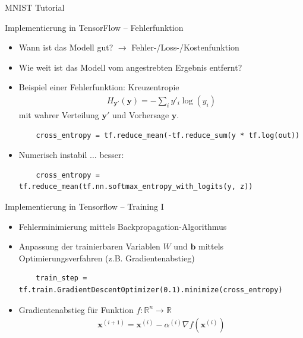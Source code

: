 \documentclass[utf8, smaller, c]{beamer}
\begin{document}
\begin{frame}{MNIST Tutorial}
	\begin{block}{Implementierung in TensorFlow -- Fehlerfunktion}
		\begin{itemize}
			\item Wann ist das Modell gut? $\rightarrow$ Fehler-/Loss-/Kostenfunktion
			\item Wie weit ist das Modell vom angestrebten Ergebnis entfernt?
			\item Beispiel einer Fehlerfunktion: Kreuzentropie
			\begin{align*}
				H_{\mathbf{y}'}(\mathbf{y}) = -\sum_i y'_i\log(y_i)
			\end{align*}
			mit wahrer Verteilung $\mathbf{y}'$ und Vorhersage $\mathbf{y}$.
			\begin{lstlisting}
	cross_entropy = tf.reduce_mean(-tf.reduce_sum(y * tf.log(out))
			\end{lstlisting}
			\item Numerisch instabil $\dots$ besser:
			\begin{lstlisting}
	cross_entropy = tf.reduce_mean(tf.nn.softmax_entropy_with_logits(y, z))
			\end{lstlisting}
		\end{itemize}
	\end{block}
	
	\framebreak
	
	\begin{block}{Implementierung in Tensorflow -- Training I}
		\begin{itemize}
			\item Fehlerminimierung mittels Backpropagation-Algorithmus
			\item Anpassung der trainierbaren Variablen $W$ und $\mathbf{b}$ mittels Optimierungsverfahren (z.B.
			Gradientenabstieg)
			\begin{lstlisting}
	train_step = tf.train.GradientDescentOptimizer(0.1).minimize(cross_entropy)
			\end{lstlisting}
			\item Gradientenabstieg für Funktion $f\colon\mathbb{R}^n \rightarrow \mathbb{R}$
			\begin{align*}
			\mathbf{x}^{(i+1)} = \mathbf{x}^{(i)} - \alpha^{(i)}\nabla f(\mathbf{x}^{(i)})
			\end{align*}
		\end{itemize}
	\end{block}
	
	\framebreak
	

\end{frame}
\end{document}
